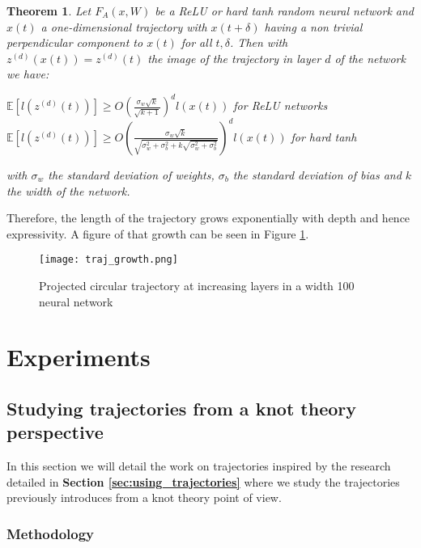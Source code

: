 \documentclass[12pt, a4paper]{article}
\newtheorem{theorem}{Theorem}
\begin{document}
\begin{theorem}
  Let $F_A(x,W)$ be a ReLU or hard tanh random neural network and $x(t)$ a one-dimensional trajectory with $x(t + \delta)$ having a non trivial perpendicular component to $x(t)$ for all $t,\delta$. Then with $z^{(d)}(x(t)) = z^{(d)}(t)$ the image of the trajectory in layer $d$ of the network we have:
  \begin{center}
    $\mathbb{E}[l(z^{(d)}(t))] \ge O(\frac{\sigma_w \sqrt{k}}{\sqrt{k+1}})^d l(x(t))$ for ReLU networks\\
    $\mathbb{E}[l(z^{(d)}(t))] \ge O(\frac{\sigma_w \sqrt{k}}{\sqrt{\sigma_w^2 + \sigma_b^2 + k\sqrt{\sigma_w^2 + \sigma_b^2}}})^d l(x(t))$ for hard tanh
  \end{center}
  with $\sigma_w$ the standard deviation of weights, $\sigma_b$ the standard deviation of bias and $k$ the width of the network.
\end{theorem}

Therefore, the length of the trajectory grows exponentially with depth and hence expressivity. A figure of that growth can be seen in Figure \ref{fig:traj_growth}.

\begin{figure}[H]
  \centering
  \texttt{[image: traj\_growth.png]}
  \caption{Projected circular trajectory at increasing layers in a width 100 neural network}
  \label{fig:traj_growth}
\end{figure}

\newpage
\thispagestyle{empty}
\mbox{}
\newpage

\section{Experiments}

\subsection{Studying trajectories from a knot theory perspective}

In this section we will detail the work on trajectories inspired by the research detailed in \textbf{Section \ref{sec:using_trajectories}} where we study the trajectories previously introduces from a knot theory point of view.

\subsubsection{Methodology}
\end{document}
